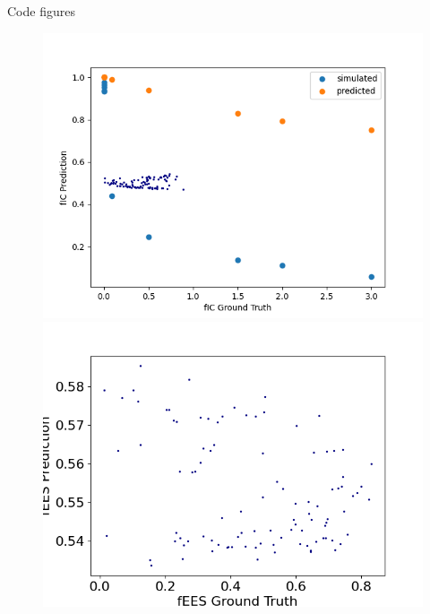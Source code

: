 \documentclass{beamer}
\begin{document}
\begin{frame}{Code figures}
\begin{figure} 
  \begin{minipage}[b]{0.4\linewidth}
  \centering
    \includegraphics[width=\linewidth]{Weekly meeting slides/meeting 2/Figure_1.png} 
  \end{minipage} 
  \begin{minipage}[b]{0.4\linewidth}
  \centering
    \includegraphics[width=\linewidth]{Weekly meeting slides/meeting 2/Figure_2.png} 
  \end{minipage} 
  \begin{minipage}[b]{0.4\linewidth}
  \centering

\end{minipage}
\end{figure}
\end{frame}
\end{document}
